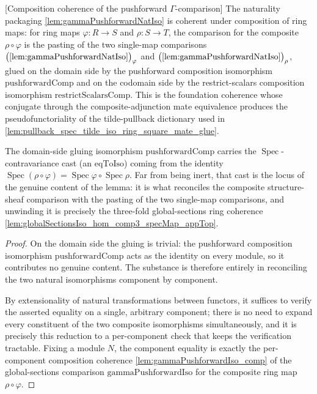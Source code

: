 \begin{lemma}


[Composition coherence of the pushforward \(\Gamma\)-comparison]
  \label{lem:gammaPushforwardNatIso_comp}
  The naturality packaging \cref{lem:gammaPushforwardNatIso} is coherent under composition of
  ring maps: for ring maps \(\varphi : R \to S\) and \(\rho : S \to T\), the comparison for the
  composite \(\rho \circ \varphi\) is the pasting of the two single-map comparisons
  \(\bigl(\text{\cref{lem:gammaPushforwardNatIso}}\bigr)_\varphi\) and
  \(\bigl(\text{\cref{lem:gammaPushforwardNatIso}}\bigr)_\rho\), glued on the domain side by the
  pushforward composition isomorphism \(\mathrm{pushforwardComp}\) and on the codomain side by the
  restrict-scalars composition isomorphism \(\mathrm{restrictScalarsComp}\). This is the foundation
  coherence whose conjugate through the composite-adjunction mate equivalence produces the
  pseudofunctoriality of the tilde-pullback dictionary used in
  \cref{lem:pullback_spec_tilde_iso_ring_square_mate_glue}.

  The domain-side gluing isomorphism \(\mathrm{pushforwardComp}\) carries the
  \(\operatorname{Spec}\)-contravariance cast (an \(\mathrm{eqToIso}\)) coming from the
  identity \(\operatorname{Spec}(\rho\circ\varphi) = \operatorname{Spec}\varphi \circ
  \operatorname{Spec}\rho\). Far from being inert, that cast is the locus of the genuine
  content of the lemma: it is what reconciles the composite structure-sheaf comparison
  with the pasting of the two single-map comparisons, and unwinding it is precisely the
  three-fold global-sections ring coherence
  \cref{lem:globalSectionsIso_hom_comp3_specMap_appTop}.
  \begin{proof}
    On the domain side the gluing is trivial: the pushforward composition isomorphism
    \(\mathrm{pushforwardComp}\) acts as the identity on every module, so it contributes no
    genuine content. The substance is therefore entirely in reconciling the two natural
    isomorphisms component by component.

    By extensionality of natural transformations between functors, it suffices to verify
    the asserted equality on a single, arbitrary component; there is no need to expand
    every constituent of the two composite isomorphisms simultaneously, and it is precisely
    this reduction to a per-component check that keeps the verification tractable. Fixing a
    module \(N\), the component equality is exactly the per-component composition coherence
    \cref{lem:gammaPushforwardIso_comp} of the global-sections comparison
    \(\mathrm{gammaPushforwardIso}\) for the composite ring map \(\rho\circ\varphi\).


\end{proof}
\end{lemma}
